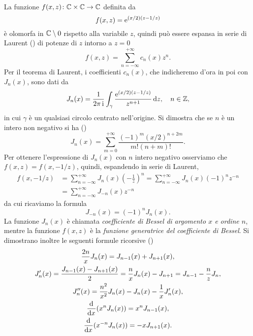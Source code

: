La funzione $f(x,z)\colon\mathbb{C}\times\mathbb{C}\to\mathbb{C}$ definita da
\begin{equation}
  f(x,z) = \operatorname{\mathrm{e}}^{(x/2)(z - 1/z)}
\end{equation}
è olomorfa in $\mathbb{C}\setminus 0$ rispetto alla variabile $z$, quindi può essere
espansa in serie di Laurent (\textcite[673]{demarco:analisi2}) di potenze di $z$
intorno a $z=0$
\begin{equation}
  f(x,z) = \sum_{n = -\infty}^{+\infty} c_n(x) z^n.
\end{equation}
Per il teorema di Laurent, i coefficienti $c_n(x)$, che indicheremo d'ora in poi
con $J_n(x)$, sono dati da
\begin{equation}
  J_n(x) = \frac{1}{2\pi\operatorname{\mathrm{i}}}\int_\gamma \frac{\operatorname{\mathrm{e}}^{(x/2)(z-1/z)}}{z^{n+1}}\mathop{}\!\mathrm{d} z,
  \quad n\in\mathbb{Z},
\end{equation}
in cui $\gamma$ è un qualsiasi circolo centrato nell'origine. Si dimostra che se
$n$ è un intero non negativo si ha (\textcite[355]{whittaker:modern-analysis})
\begin{equation}
  J_n (x) = \sum_{m = 0}^{+\infty}\frac{(-1)^m(x/2)^{n+2m}}{m!(n+m)!}.
\end{equation}
Per ottenere l'espressione di $J_n(x)$ con $n$ intero negativo osserviamo che
$f(x,z) = f(x,-1/z)$, quindi, espandendo in serie di Laurent,
\begin{equation}
  \begin{split}
    f(x,-1/z) &= \sum_{n = -\infty}^{+\infty}J_n(x)
    \left(
      -\frac{1}{z}
    \right)^n = \sum_{n = -\infty}^{+\infty}J_n(x)(-1)^nz^{-n} \\
    &= \sum_{n = -\infty}^{+\infty}J_{-n}(x)z^{-n}
  \end{split}
\end{equation}
da cui ricaviamo la formula
\begin{equation}
  J_{-n}(x) = (-1)^nJ_n(x).
\end{equation}
La funzione $J_n(x)$ è chiamata \emph{coefficiente di Bessel di argomento $x$ e
  ordine $n$}, mentre la funzione $f(x,z)$ è la \emph{funzione generatrice del
  coefficiente di Bessel}. Si dimostrano inoltre le seguenti formule ricorsive
(\textcites[17]{watson:bessel}[359]{whittaker:modern-analysis})
\begin{subequations}
  \begin{gather}
    \frac{2n}{x} J_n(x) = J_{n-1}(x) + J_{n+1}(x),\\
    J_n'(x) = \frac{J_{n-1}(x) - J_{n+1}(x)}{2} = \frac{n}{x}J_n(x) - J_{n+1} =
    J_{n-1} - \frac{n}{z}J_n,\\
    J_n''(x) = \frac{n^2}{x^2}J_n(x) - J_n(x) - \frac{1}{x}J_n'(x),\\
    \frac{{\mathop{}\!\mathrm{d}^{}}}{\mathop{}\!\mathrm{d} {x}^{}}(x^nJ_n(x)) = x^nJ_{n-1}(x),\\
    \frac{{\mathop{}\!\mathrm{d}^{}}}{\mathop{}\!\mathrm{d} {x}^{}}(x^{-n}J_n(x)) = -xJ_{n+1}(x).
  \end{gather}
\end{subequations}
